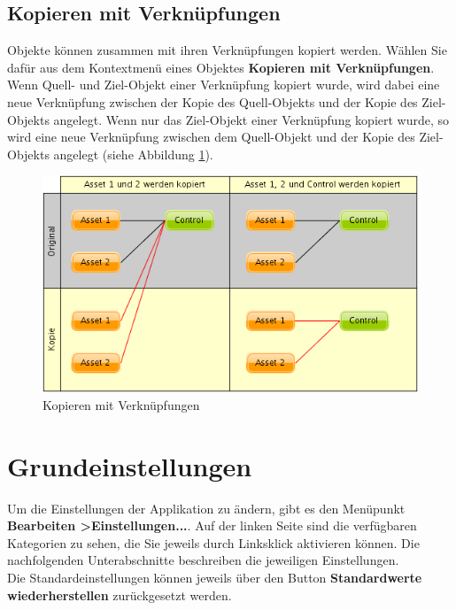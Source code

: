 \documentclass[a4paper,10pt]{book}
\begin{document}
\section{Kopieren mit Verknüpfungen}
Objekte können zusammen mit ihren Verknüpfungen kopiert werden. Wählen Sie dafür aus dem Kontextmenü eines Objektes \textbf{Kopieren mit Verknüpfungen}.
Wenn Quell- und Ziel-Objekt einer Verknüpfung kopiert wurde, wird dabei eine neue Verknüpfung zwischen der Kopie des Quell-Objekts und der Kopie des Ziel-Objekts angelegt.
Wenn nur das Ziel-Objekt einer Verknüpfung kopiert wurde, so wird eine neue Verknüpfung zwischen dem Quell-Objekt und der Kopie des Ziel-Objekts angelegt (siehe Abbildung \ref{Kopieren mit Verknüpfungen}).
\begin{figure}[htb!]
  \centering
  \includegraphics[scale=.38]{Screenshot/copy_with_links.png}
  \caption{\label{Kopieren mit Verknüpfungen} Kopieren mit Verknüpfungen}
\end{figure}

\chapter{Grundeinstellungen}
Um die Einstellungen der Applikation zu ändern, gibt es den Menüpunkt \textbf{Bearbeiten \textgreater Einstellungen...}. Auf der linken Seite
sind die verfügbaren Kategorien zu sehen, die Sie jeweils durch Linksklick aktivieren können. Die nachfolgenden Unterabschnitte
beschreiben die jeweiligen Einstellungen.
\newline\\
Die Standardeinstellungen können jeweils über den Button \textbf{Standardwerte wiederherstellen} zurückgesetzt werden.
\end{document}
